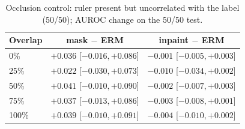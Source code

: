 \begin{table}[H]\centering\small
\caption{Occlusion control: ruler present but uncorrelated with the label (50/50); AUROC change on the 50/50 test.}\label{tab:occ}
\begin{tabular}{lcc}\toprule
Overlap & mask $-$ ERM & inpaint $-$ ERM \\\midrule
0\% & $+0.036$ [$-0.016, +0.086$] & $-0.001$ [$-0.005, +0.003$] \\
25\% & $+0.022$ [$-0.030, +0.073$] & $-0.010$ [$-0.034, +0.002$] \\
50\% & $+0.041$ [$-0.010, +0.090$] & $-0.002$ [$-0.007, +0.003$] \\
75\% & $+0.037$ [$-0.013, +0.086$] & $-0.003$ [$-0.008, +0.001$] \\
100\% & $+0.039$ [$-0.010, +0.091$] & $-0.004$ [$-0.010, +0.002$] \\
\bottomrule\end{tabular}
\end{table}
